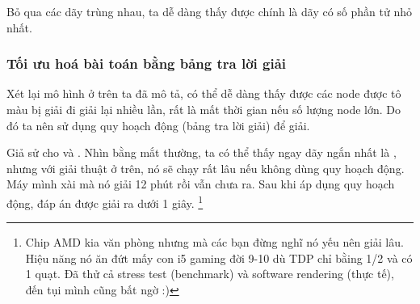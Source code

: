 \documentclass[main.tex]{subfiles}
\begin{document}
Bỏ qua các dãy trùng nhau, ta dễ dàng thấy được  chính là dãy có số phần tử nhỏ nhất.

\subsubsection{Tối ưu hoá bài toán bằng bảng tra lời giải}
Xét lại mô hình ở trên ta đã mô tả, có thể dễ dàng thấy được các node được tô màu bị giải đi giải lại nhiều lần, rất là mất thời gian nếu số lượng node lớn. Do đó ta nên sử dụng quy hoạch động (bảng tra lời giải) để giải. 

\begin{center}
\end{center}

Giả sử cho  và . Nhìn bằng mắt thường, ta có thể thấy ngay dãy ngắn nhất là , nhưng với giải thuật ở trên, nó sẽ chạy rất lâu nếu không dùng quy hoạch động. Máy mình xài  mà nó giải 12 phút rồi vẫn chưa ra. Sau khi áp dụng quy hoạch động, đáp án được giải ra dưới 1 giây.
\footnote{\scriptsize Chip AMD kia văn phòng nhưng mà các bạn đừng nghĩ nó yếu nên giải lâu. Hiệu năng nó ăn đứt mấy con i5 gaming đời 9-10 dù TDP chỉ bằing 1/2 và có 1 quạt. Đã thử cả stress test (benchmark) và software rendering (thực tế), đến tụi mình cũng bất ngờ :)}
\end{document}
